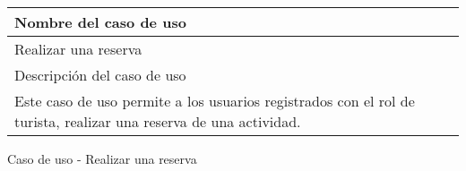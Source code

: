 \begin{identificacionCasoDeUso}
	\begin{tabular} { | p{17cm} |}

		\hline
		Nombre del caso de uso                                                                                            \\ \hline
		Realizar una reserva                                                                                              \\ \hline
		Descripción del caso de uso                                                                                       \\ \hline
		Este caso de uso permite a los usuarios registrados con el rol de turista, realizar una reserva de una actividad. \\ \hline
	\end{tabular}
	\caption{Caso de uso - Realizar una reserva}
\end{identificacionCasoDeUso}